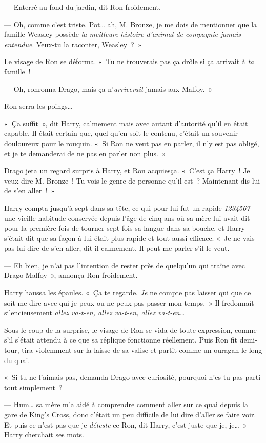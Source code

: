 --- Enterré au fond du jardin, dit Ron froidement.

--- Oh, comme c'est triste. Pot… ah, M. Bronze, je me dois de mentionner que la famille Weasley possède \emph{la meilleure histoire d'animal de compagnie jamais entendue}. Veux-tu la raconter, Weasley~?~»

Le visage de Ron se déforma.  «~Tu ne trouverais pas ça drôle si ça arrivait à \emph{ta} famille~!

--- Oh, ronronna Drago, mais ça n'\emph{arriverait} jamais aux Malfoy.~»

Ron serra les poings…

«~Ça suffit~», dit Harry, calmement mais avec autant d'autorité qu'il en était capable.
Il était certain que, quel qu'en soit le contenu, c'était un souvenir douloureux pour le rouquin.
«~Si Ron ne veut pas en parler, il n'y est pas obligé, et je te demanderai de ne pas en parler non plus.~»

Drago jeta un regard surpris à Harry, et Ron acquiesça.
«~C'est ça Harry~! Je veux dire M. Bronze~! Tu vois le genre de personne qu'il est~? Maintenant dis-lui de s'en aller~!~»

Harry compta jusqu'à sept dans sa tête, ce qui pour lui fut un rapide \emph{1234567} -- une vieille habitude conservée depuis l'âge de cinq ans où sa mère lui avait dit pour la première fois de tourner sept fois sa langue dans sa bouche, et Harry s'était dit que sa façon à lui était plus rapide et tout aussi efficace. «~Je ne vais pas lui dire de s'en aller, dit-il calmement. Il peut me parler s'il le veut.

--- Eh bien, je n'ai pas l'intention de rester près de quelqu'un qui traîne avec Drago Malfoy~», annonça Ron froidement.

Harry haussa les épaules. «~Ça te regarde. \emph{Je} ne compte pas laisser qui que ce soit me dire avec qui je peux ou ne peux pas passer mon temps.~»
Il fredonnait silencieusement \emph{allez va-t-en, allez va-t-en, allez va-t-en…}

Sous le coup de la surprise, le visage de Ron se vida de toute expression, comme s'il s'était attendu à ce que sa réplique fonctionne réellement.
Puis Ron fit demi-tour, tira violemment sur la laisse de sa valise et partit comme un ouragan le long du quai.

«~Si tu ne l'aimais pas, demanda Drago avec curiosité, pourquoi n'es-tu pas parti tout simplement~?

--- Hum… sa mère m'a aidé à comprendre comment aller sur ce quai depuis la gare de King's Cross, donc c'était un peu difficile de lui dire d'aller se faire voir.
Et puis ce n'est pas que je \emph{déteste} ce Ron, dit Harry, c'est juste que je, je…~» Harry cherchait ses mots.

